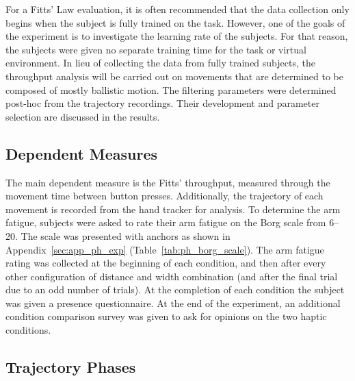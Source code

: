 For a Fitts' Law evaluation, it is often recommended that the data collection only begins when the subject is fully trained on the task.
However, one of the goals of the experiment is to investigate the learning rate of the subjects.
For that reason, the subjects were given no separate training time for the task or virtual environment.
In lieu of collecting the data from fully trained subjects, the throughput analysis will be carried out on movements that are determined to be composed of mostly ballistic motion.
The filtering parameters were determined post-hoc from the trajectory recordings.
Their development and parameter selection are discussed in the results.

\subsection{Dependent Measures}

The main dependent measure is the Fitts' throughput, measured through the movement time between button presses.
Additionally, the trajectory of each movement is recorded from the hand tracker for analysis.
To determine the arm fatigue, subjects were asked to rate their arm fatigue on the Borg scale from \numrange{6}{20}.
The scale was presented with anchors as shown in Appendix~\ref{sec:app_ph_exp} (Table~\ref{tab:ph_borg_scale}).
The arm fatigue rating was collected at the beginning of each condition, and then after every other configuration of distance and width combination (and after the final trial due to an odd number of trials).
At the completion of each condition the subject was given a presence questionnaire.
At the end of the experiment, an additional condition comparison survey was given to ask for opinions on the two haptic conditions.

\subsection{Trajectory Phases}
\label{sec:ph_traj_phases}

